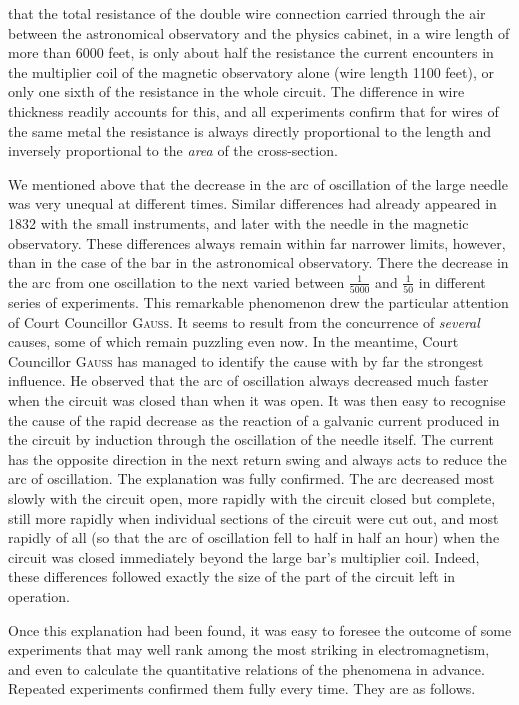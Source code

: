that the total resistance of the double wire connection carried through the air between the astronomical observatory and the physics cabinet, in a wire length of more than 6000 feet, is only about half the resistance the current encounters in the multiplier coil of the magnetic observatory alone (wire length 1100 feet), or only one sixth of the resistance in the whole circuit. The difference in wire thickness readily accounts for this, and all experiments confirm that for wires of the same metal the resistance is always directly proportional to the length and inversely proportional to the \textit{area} of the cross-section.

We mentioned above that the decrease in the arc of oscillation of the large needle was very unequal at different times. Similar differences had already appeared in 1832 with the small instruments, and later with the needle in the magnetic observatory. These differences always remain within far narrower limits, however, than in the case of the bar in the astronomical observatory. There the decrease in the arc from one oscillation to the next varied between $\frac{1}{5000}$ and $\frac{1}{50}$ in different series of experiments. This remarkable phenomenon drew the particular attention of Court Councillor \textsc{Gauss}. It seems to result from the concurrence of \textit{several} causes, some of which remain puzzling even now. In the meantime, Court Councillor \textsc{Gauss} has managed to identify the cause with by far the strongest influence. He observed that the arc of oscillation always decreased much faster when the circuit was closed than when it was open. It was then easy to recognise the cause of the rapid decrease as the reaction of a galvanic current produced in the circuit by induction through the oscillation of the needle itself. The current has the opposite direction in the next return swing and always acts to reduce the arc of oscillation. The explanation was fully confirmed. The arc decreased most slowly with the circuit open, more rapidly with the circuit closed but complete, still more rapidly when individual sections of the circuit were cut out, and most rapidly of all (so that the arc of oscillation fell to half in half an hour) when the circuit was closed immediately beyond the large bar’s multiplier coil. Indeed, these differences followed exactly the size of the part of the circuit left in operation.

Once this explanation had been found, it was easy to foresee the outcome of some experiments that may well rank among the most striking in electromagnetism, and even to calculate the quantitative relations of the phenomena in advance. Repeated experiments confirmed them fully every time. They are as follows.


